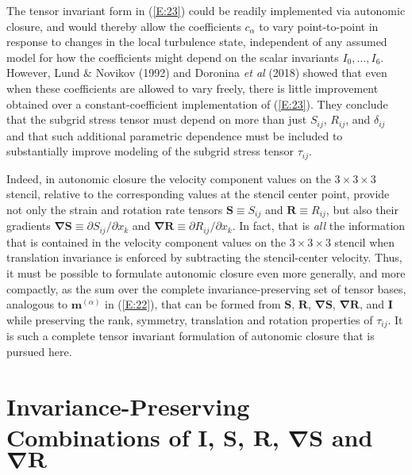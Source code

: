 The tensor invariant form in (\ref{E:23}) could be readily implemented via autonomic closure, and would thereby allow the coefficients $c_{\alpha}$  to vary point-to-point in response to changes in the local turbulence state, independent of any assumed model for how the coefficients might depend on the scalar invariants $I_0,\ldots,I_6$. However, Lund $\&$ Novikov (1992) and Doronina \textit{et al} (2018) showed that even when these coefficients are allowed to vary freely, there is little improvement obtained over a constant-coefficient implementation of (\ref{E:23}). They conclude that the subgrid stress tensor must depend on more than just $S_{ij}$, $R_{ij}$, and $\delta_{ij}$ and that such additional parametric dependence must be included to substantially improve modeling of the subgrid stress tensor $\tau_{ij}$.

Indeed, in autonomic closure the velocity component values on the $3 \times 3\times 3$  stencil, relative to the corresponding values at the stencil center point, provide not only the strain and rotation rate tensors $\mathbf{S} \equiv S_{ij}$  and $\mathbf{R} \equiv R_{ij}$, but also their gradients  $\mathbf{\nabla S} \equiv \partial S_{ij}/ \partial x_{k}$ and $\mathbf{\nabla R} \equiv \partial R_{ij}/ \partial x_{k}$. In fact, that is \textit{all} the information that is contained in the velocity component values on the $3 \times 3\times 3$  stencil when translation invariance is enforced by subtracting the stencil-center velocity. Thus, it must be possible to formulate autonomic closure even more generally, and more compactly, as the sum over the complete invariance-preserving set of tensor bases, analogous to  $\mathbf{m}^{(\alpha)}$ in (\ref{E:22}), that can be formed from $\mathbf{S}$, $\mathbf{R}$, $\mathbf{\nabla S}$, $\mathbf{\nabla R}$, and $\mathbf{I}$  while preserving the rank, symmetry, translation and rotation properties of $\tau_{ij}$. It is such a complete tensor invariant formulation of autonomic closure that is pursued here. 

\section{Invariance-Preserving Combinations of $\mathbf{I}$, $\mathbf{S}$, $\mathbf{R}$, $\mathbf{\nabla S}$ and $\mathbf{\nabla R}$}
\label{sec:2}

